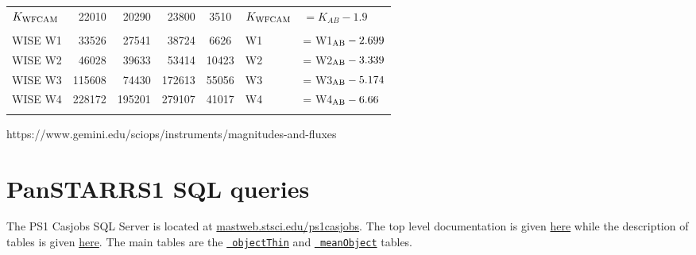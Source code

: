 \documentclass[usenatbib]{mnras}
\begin{document}
\begin{table*}
\begin{center}
\begin{tabular}{l r r r  c l l}
      $K_{\rm WFCAM}$     &    22010     &    20290 &    23800         &   3510          & $K_{\rm WFCAM}$     & $ = K_{AB} - 1.9  $          \\ 
      &&&&&&\\
      WISE W1               &    33526    &    27541  &    38724   &    6626    & W1                        &   = W1$_{\rm AB} - 2.699$ \\
      WISE W2               &    46028    &    39633  &    53414   &  10423    & W2                        &   = W2$_{\rm AB} - 3.339$ \\
      WISE W3               &  115608    &    74430  &  172613   &  55056    & W3                        &   = W3$_{\rm AB} - 5.174$ \\
      WISE W4               &  228172    &  195201  &  279107   &  41017    & W4                        &   = W4$_{\rm AB} - 6.66$ \\
      \hline
      \hline
      \label{tab:filter_details}
    \end{tabular}
     \end{center}
\end{table*}
https://www.gemini.edu/sciops/instruments/magnitudes-and-fluxes





\section{PanSTARRS1 SQL queries}\label{sec:PS1_SQL}
The PS1 Casjobs SQL Server is located at
\href{http://mastweb.stsci.edu/ps1casjobs}{mastweb.stsci.edu/ps1casjobs}.
The top level documentation is given
\href{https://outerspace.stsci.edu/display/PANSTARRS/PS1+Source+extraction+and+catalogs}{here}
while the description of tables is given
\href{https://outerspace.stsci.edu/display/PANSTARRS/PS1+Source+extraction+and+catalogs#PS1Sourceextractionandcatalogs}{here}. The
main tables are the
\href{https://outerspace.stsci.edu/display/PANSTARRS/PS1+ObjectThin+table+fields}{{\tt
objectThin}} and
\href{https://outerspace.stsci.edu/display/PANSTARRS/PS1+MeanObject+table+fields}{{\tt
meanObject}} tables.
\end{document}
